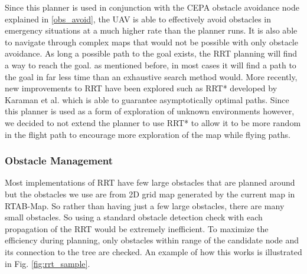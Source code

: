 \documentclass[letterpaper, 10 pt, conference]{ieeeconf}  %
\begin{document}
Since this planner is used in conjunction with the CEPA obstacle avoidance node explained in \ref{obs_avoid}, the UAV is able to effectively avoid obstacles in emergency situations at a much higher rate than the planner runs. It is also able to navigate through complex maps that would not be possible with only obstacle avoidance. As long a possible path to the goal exists, the RRT planning will find a way to reach the goal. as mentioned before, in most cases it will find a path to the goal in far less time than an exhaustive search method would. More recently, new improvements to RRT have been explored such as RRT* developed by Karaman et al. \cite{Karaman2011} which is able to guarantee asymptotically optimal paths. Since this planner is used as a form of exploration of unknown environments however, we decided to not extend the planner to use RRT* to allow it to be more random in the flight path to encourage more exploration of the map while flying paths.

\subsubsection{Obstacle Management}
Most implementations of RRT have few large obstacles that are planned around but the obstacles we use are from 2D grid map generated by the current map in RTAB-Map. So rather than having just a few large obstacles, there are many small obstacles. So using a standard obstacle detection check with each propagation of the RRT would be extremely inefficient. To maximize the efficiency during planning, only obstacles within range of the candidate node and its connection to the tree are checked. An example of how this works is illustrated in Fig. \ref{fig:rrt_sample}.
\end{document}
